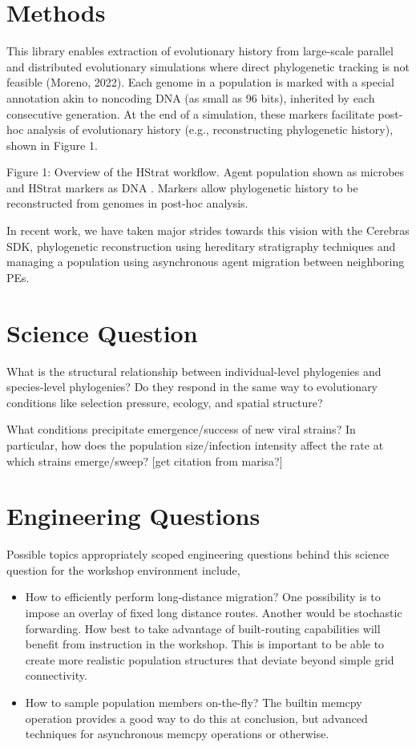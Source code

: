 \section{Methods}
This library enables extraction of evolutionary history from large-scale parallel and distributed evolutionary simulations where direct phylogenetic tracking is not feasible (Moreno, 2022). Each genome in a population is marked with a special annotation akin to noncoding DNA (as small as 96 bits), inherited by each consecutive generation. At the end of a simulation, these markers facilitate post-hoc analysis of evolutionary history (e.g., reconstructing phylogenetic history), shown in Figure 1.

Figure 1: Overview of the HStrat workflow. Agent population shown as microbes and HStrat markers as DNA . Markers allow phylogenetic history to be reconstructed from genomes in post-hoc analysis.

In recent work, we have taken major strides towards this vision with the Cerebras SDK, phylogenetic reconstruction using hereditary stratigraphy techniques and managing a population using asynchronous agent migration between neighboring PEs.

\section{Science Question}
What is the structural relationship between individual-level phylogenies and species-level phylogenies? Do they respond in the same way to evolutionary conditions like selection pressure, ecology, and spatial structure?

What conditions precipitate emergence/success of new viral strains? In particular, how does the population size/infection intensity affect the rate at which strains emerge/sweep?  [get citation from marisa?]

\section{Engineering Questions}
Possible topics appropriately scoped engineering questions behind this science question for the workshop environment include,
\begin{itemize}
\item How to efficiently perform long-distance migration?
One possibility is to impose an overlay of fixed long distance routes.
Another would be stochastic forwarding.
How best to take advantage of built-routing capabilities will benefit from instruction in the workshop.
This is important to be able to create more realistic population structures that deviate beyond simple grid connectivity.
\item How to sample population members on-the-fly?
The builtin memcpy operation provides a good way to do this at conclusion, but advanced techniques for asynchronous memcpy operations or otherwise.
\end{itemize}

